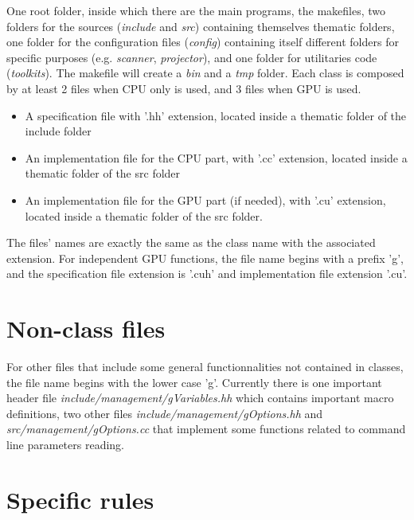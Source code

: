 \documentclass[a4paper, 11pt]{article}
\begin{document}
One root folder, inside which there are the main programs, the makefiles, two folders for the sources (\textit{include} and \textit{src}) containing themselves
thematic folders, one folder for the configuration files (\textit{config}) containing itself different folders for specific purposes (e.g. \textit{scanner},
\textit{projector}), and one folder for utilitaries code (\textit{toolkits}).
The makefile will create a \textit{bin} and a \textit{tmp} folder.
Each class is composed by at least 2 files when CPU only is used, and 3 files when GPU is used.
\begin{itemize}
  \item A specification file with '.hh' extension, located inside a thematic folder of the include folder
  \item An implementation file for the CPU part, with '.cc' extension, located inside a thematic folder of the src folder
  \item An implementation file for the GPU part (if needed), with '.cu' extension, located inside a thematic folder of the src folder.
\end{itemize}
The files' names are exactly the same as the class name with the associated extension.
For independent GPU functions, the file name begins with a prefix 'g', and the specification file extension is '.cuh' and implementation file extension '.cu'.

\section{Non-class files}

For other files that include some general functionnalities not contained in classes, the file name begins with the lower case 'g'.
Currently there is one important header file \textit{include/management/gVariables.hh} which contains important macro definitions, two other files
\textit{include/management/gOptions.hh} and \textit{src/management/gOptions.cc} that implement some functions related to command line parameters reading.

\section{Specific rules}
\end{document}
